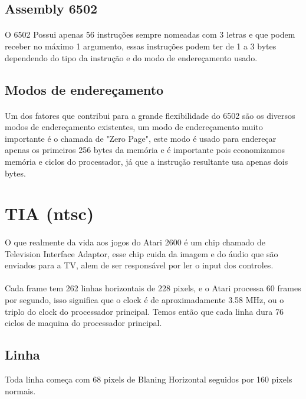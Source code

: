 \documentclass{article}
\begin{document}
\subsection{Assembly 6502}
\paragraph{}
O 6502 Possui apenas 56 instruções sempre nomeadas com 3 letras e que podem receber no máximo 1 argumento, essas instruções podem ter de 1 a 3 bytes dependendo do tipo da instrução e do modo de endereçamento usado.


\subsection{Modos de endereçamento}
\paragraph{}
Um dos fatores que contribui para a grande flexibilidade do 6502 são os diversos modos de endereçamento existentes, um modo de endereçamento muito importante é o chamada de "Zero Page", este modo é usado para endereçar apenas os primeiros 256 bytes da memória e é importante pois economizamos memória e ciclos do processador, já que a instrução resultante usa apenas dois bytes.


\section{TIA (ntsc)}

\paragraph{}
O que realmente da vida aos jogos do Atari 2600 é um chip chamado de Television Interface Adaptor, esse chip cuida da imagem e do áudio que são enviados para a TV, alem de ser responsável por ler o input dos controles.
\paragraph{}
Cada frame tem 262 linhas horizontais de 228 pixels, e o Atari processa 60 frames por segundo, isso significa que o clock é de aproximadamente 3.58 MHz, ou o triplo do clock do processador principal. Temos então que cada linha dura 76 ciclos de maquina do processador principal.

\subsection{Linha}
Toda linha começa com 68 pixels de Blaning Horizontal seguidos por 160 pixels normais.
\end{document}
